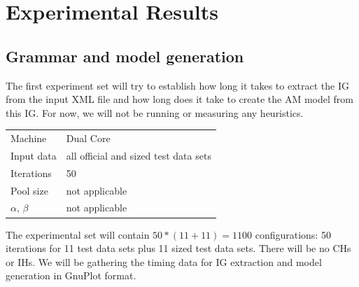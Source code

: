 \section{Experimental Results}

\subsection{Grammar and model generation}
\label{section-grammar-model-timing}


The first experiment set will try to establish how long it takes to extract the IG %
from the input XML file and how long does it take to create the AM model from this IG. For now, we will not be running or measuring any heuristics.

\begin{center}
\bigskip
\begin{tabular}{| l | l |}
  \hline
  \hline
  Machine           & Dual Core \\
  Input data        & all official and sized test data sets \\
  Iterations        & 50 \\
  Pool size         & not applicable \\
  $\alpha$, $\beta$ & not applicable \\
  \hline
\end{tabular}
\bigskip
\end{center}

The experimental set will contain $50 * (11 + 11) = 1100$ configurations: 50 iterations for 11 test data sets plus 11 sized test data sets. There will be no CHs or IHs. We will be gathering the timing data for IG extraction and model generation in GnuPlot format.

